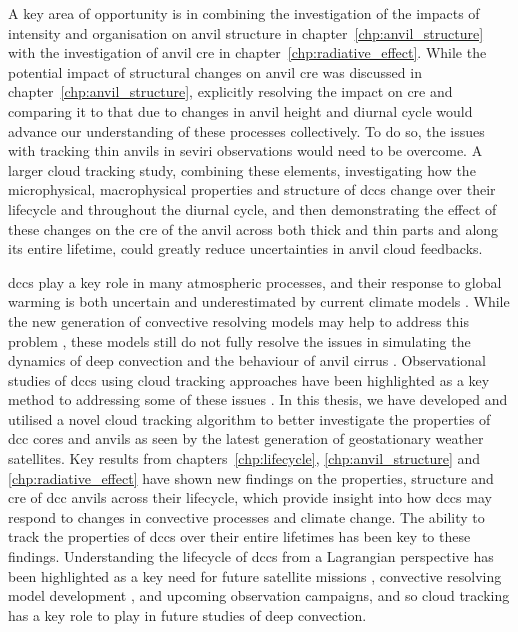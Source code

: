 A key area of opportunity is in combining the investigation of the impacts of intensity and organisation on anvil structure in chapter~\ref{chp:anvil_structure} with the investigation of anvil \acrshort{cre} in chapter~\ref{chp:radiative_effect}.
While the potential impact of structural changes on anvil \acrshort{cre} was discussed in chapter~\ref{chp:anvil_structure}, explicitly resolving the impact on \acrshort{cre} and comparing it to that due to changes in anvil height and diurnal cycle would advance our understanding of these processes collectively.
To do so, the issues with tracking thin anvils in \acrshort{seviri} observations would need to be overcome.
A larger cloud tracking study, combining these elements, investigating how the microphysical, macrophysical properties and structure of \acrshort{dcc}s change over their lifecycle and throughout the diurnal cycle, and then demonstrating the effect of these changes on the \acrshort{cre} of the anvil across both thick and thin parts and along its entire lifetime, could greatly reduce uncertainties in anvil cloud feedbacks.

\acrshort{dcc}s play a key role in many atmospheric processes, and their response to global warming is both uncertain \citep{sherwood_assessment_2020} and underestimated by current climate models \citep{hill_climate_2023}.
While the new generation of convective resolving models may help to address this problem \citep{stevens_added_2020}, these models still do not fully resolve the issues in simulating the dynamics of deep convection \citep{jeevanjee_vertical_2017} and the behaviour of anvil cirrus \citep{sullivan_ice_2021}.
Observational studies of \acrshort{dcc}s using cloud tracking approaches have been highlighted as a key method to addressing some of these issues \citep{gasparini_opinion_2023}.
In this thesis, we have developed and utilised a novel cloud tracking algorithm to better investigate the properties of \acrshort{dcc} cores and anvils as seen by the latest generation of geostationary weather satellites.
Key results from chapters~\ref{chp:lifecycle}, \ref{chp:anvil_structure} and \ref{chp:radiative_effect} have shown new findings on the properties, structure and \acrshort{cre} of \acrshort{dcc} anvils across their lifecycle, which provide insight into how \acrshort{dcc}s may respond to changes in convective processes and climate change.
The ability to track the properties of \acrshort{dcc}s over their entire lifetimes has been key to these findings.
Understanding the lifecycle of \acrshort{dcc}s from a Lagrangian perspective has been highlighted as a key need for future satellite missions \citep{vandenheever_tropical_2023}, convective resolving model development \citep{prein_kmscale_2024}, and upcoming observation campaigns, and so cloud tracking has a key role to play in future studies of deep convection.

